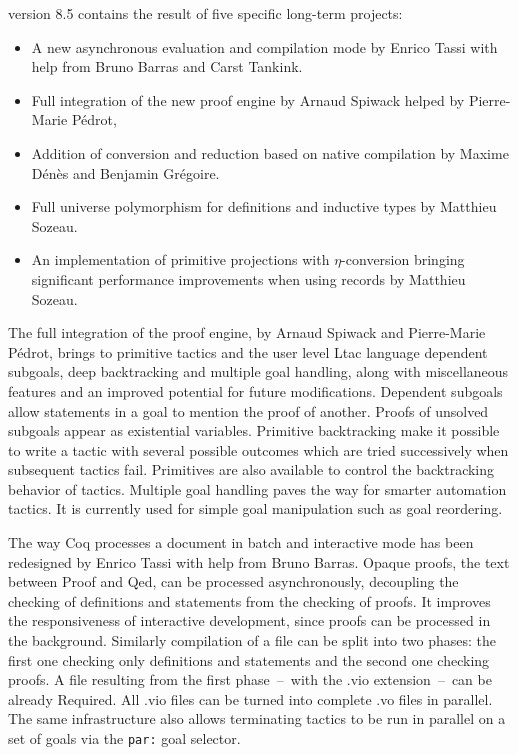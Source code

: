 {\Coq} version 8.5 contains the result of five specific long-term
projects:
\begin{itemize}
\item A new asynchronous evaluation and compilation mode by Enrico
  Tassi with help from Bruno Barras and Carst Tankink.
\item Full integration of the new proof engine by Arnaud Spiwack
  helped by Pierre-Marie Pédrot,
\item Addition of conversion and reduction based on native compilation
  by Maxime Dénès and Benjamin Grégoire.
\item Full universe polymorphism for definitions and inductive types by
  Matthieu Sozeau.
\item An implementation of primitive projections with $\eta$-conversion
  bringing significant performance improvements when using records by
  Matthieu Sozeau.
\end{itemize}

The full integration of the proof engine, by Arnaud Spiwack and
Pierre-Marie Pédrot, brings to primitive tactics and the user level
Ltac language dependent subgoals, deep backtracking and multiple goal
handling, along with miscellaneous features and an improved potential
for future modifications. Dependent subgoals allow statements in a
goal to mention the proof of another. Proofs of unsolved subgoals
appear as existential variables. Primitive backtracking make it
possible to write a tactic with several possible outcomes which are
tried successively when subsequent tactics fail. Primitives are also
available to control the backtracking behavior of tactics. Multiple
goal handling paves the way for smarter automation tactics. It is
currently used for simple goal manipulation such as goal reordering.

The way Coq processes a document in batch and interactive mode has
been redesigned by Enrico Tassi with help from Bruno Barras.  Opaque
proofs, the text between Proof and Qed, can be processed
asynchronously, decoupling the checking of definitions and statements
from the checking of proofs.  It improves the responsiveness of
interactive development, since proofs can be processed in the
background.  Similarly compilation of a file can be split into two
phases: the first one checking only definitions and statements and the
second one checking proofs.  A file resulting from the first
phase~--~with the .vio extension~--~can be already Required.  All .vio
files can be turned into complete .vo files in parallel.  The same
infrastructure also allows terminating tactics to be run in parallel
on a set of goals via the \verb=par:= goal selector.

